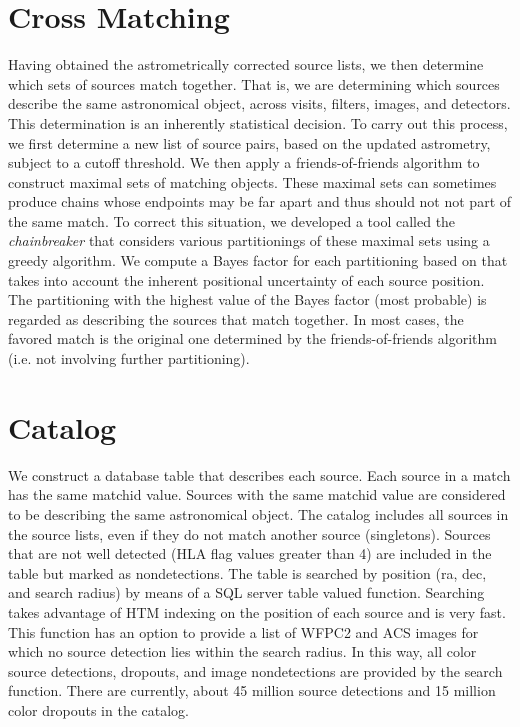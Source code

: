 \section{Cross Matching}
Having obtained the astrometrically corrected source lists, we then determine which sets of sources match together. That is, we are determining which sources describe the same astronomical object, across visits, filters, images, and detectors. This determination is an inherently statistical decision. To carry out this process, we first determine a new list of source pairs, based on the updated astrometry, subject to a cutoff threshold. We then apply a friends-of-friends algorithm to construct maximal sets of matching objects. These maximal sets can sometimes produce chains whose endpoints may be far apart and thus should not not part of the same match. To correct this situation, we developed a tool called the {\it chainbreaker} that considers various partitionings of these maximal sets using a greedy algorithm. We compute a Bayes factor for each partitioning based on \cite{2008ApJ...679..301B} that takes into account the inherent positional uncertainty of each source position. The partitioning with the highest value of the Bayes factor (most probable) is regarded as describing the sources that match together. In most cases, the favored match is the original one determined by the friends-of-friends algorithm (i.e. not involving further partitioning). 

\section{Catalog}
We construct a database table that describes each source. Each source in a match has the same matchid value. Sources with the same matchid value are considered to be describing the same astronomical object. The catalog includes all sources in the source lists, even if they do not match another source (singletons). Sources that are not well detected (HLA flag values greater than 4) are included in the table but marked as nondetections. The table is searched by position (ra, dec, and search radius) by means of a SQL server table valued function.  Searching takes advantage of HTM indexing on the position of each source and is very fast. This function has an option to provide a list of WFPC2 and ACS images for which no source detection lies within the search radius. In this way, all color source detections, dropouts, and image nondetections are provided by the search function.  There are currently, about 45 million source detections and 15 million color dropouts in the catalog.

